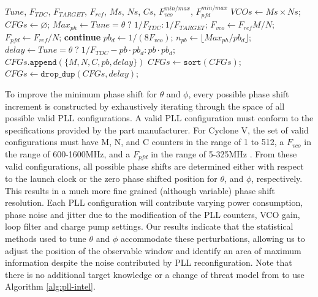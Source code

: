 \setlength{\textfloatsep}{10pt} {
	\begin{algorithm}[t!]
		\footnotesize
		\caption{PLL configuration preprocessing for Altera FPGAs. Given a tuning parameter ($Tune \in \{\theta, \phi\}$), the TDC frequency ($F_{TDC}$), target frequency ($F_{TARGET}$), upstream PLL reference frequency ($F_{ref}$), and FPGA-dependent PLL counter, VCO, and PFD constraints ($Ms$, $Ns$, $Cs$, $F_{vco}^{min/max}$, $F_{pfd}^{min/max}$), compute PLL configurations spanning a range of phase-shift positions offset from either the launch clock ($\theta$) or the PLL initial phase ($\phi$).\label{alg:pll-intel}}
		\begin{algorithmic}[1]
			\Require $Tune$, $F_{TDC}$, $F_{TARGET}$, $F_{ref}$, $Ms$, $Ns$, $Cs$, $F_{vco}^{min/max}$, $F_{pfd}^{min/max}$
			\State $VCOs \gets Ms \times Ns$;\; $CFGs \gets \varnothing$; 
			\State $Max_{ph} \gets Tune\!=\!\theta \;?\; 1/F_{TDC} : 1/F_{TARGET}$;
			\State $F_{vco} \gets F_{ref}M/N$;\; $F_{pfd} \gets F_{ref}/N$;
			\State \textbf{continue}
			\EndIf
			\State $pb_d \gets 1/(8F_{vco})$;\; $n_{pb} \gets \lfloor Max_{ph}/pb_d \rfloor$; 
			\State $delay \gets Tune\!=\!\theta \;?\; 1/F_{TDC} - pb\cdot pb_d : pb\cdot pb_d$;
			\State $CFGs.\texttt{append}(\{M, N, C, pb, delay\})$
			\EndFor
			\EndFor
			\EndFor
			\State $CFGs \gets \texttt{sort}(CFGs)$;\; $CFGs \gets \texttt{drop\_dup}(CFGs, delay)$; 
		\end{algorithmic}
	\end{algorithm}
}
\setlength{\textfloatsep}{10pt}

To improve the minimum phase shift for $\theta$ and $\phi$, every
possible phase shift increment is constructed by exhaustively iterating
through the space of all possible valid PLL configurations. A valid PLL
configuration must conform to the specifications provided by the part
manufacturer. For Cyclone V, the set of valid configurations must have
M, N, and C counters in the range of 1 to 512, a $F_{vco}$ in the range
of 600-1600MHz, and a $F_{pfd}$ in the range of 5-325MHz
\cite{intel_pll-spec}. From these valid configurations, all possible
phase shifts are determined either with respect to the launch clock or
the zero phase shifted position for $\theta$, and $\phi$, respectively.
This results in a much more fine grained (although variable) phase shift
resolution. Each PLL configuration will contribute varying power
consumption, phase noise and jitter due to the modification of the PLL
counters, VCO gain, loop filter and charge pump settings. Our results
indicate that the statistical methods used to tune $\theta$ and $\phi$
accommodate these perturbations, allowing us to adjust the position of
the observable window and identify an area of maximum information
despite the noise contributed by PLL reconfiguration. Note that there is
no additional target knowledge or a change of threat model from
\cite{drewes2024pentimento} to use Algorithm \ref{alg:pll-intel}.

